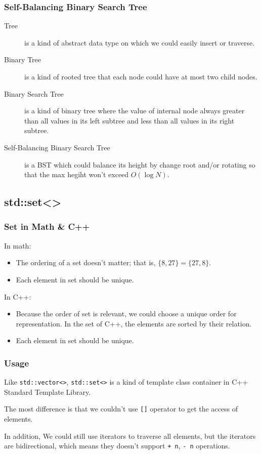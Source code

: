 \documentclass{beamer}
\begin{document}
\frame
{
	\frametitle{Self-Balancing Binary Search Tree}
	
	\begin{description}
		\item[Tree] is a kind of abstract data type on which we could easily insert or traverse.\pause
		\item[Binary Tree] is a kind of rooted tree that each node could have at most two child nodes.\pause
		\item[Binary Search Tree] is a kind of binary tree where the value of internal node always greater than all values in its left subtree and less than all values in its right subtree.\pause
		\item[Self-Balancing Binary Search Tree] is a BST which could balance its height by change root and/or rotating so that the max hegiht won't exceed $O(\log N)$.
	\end{description}
}

\subsection{std::set<>}

\frame
{
	\frametitle{Set in Math \& C++}
	
	In math:
	\begin{itemize}
		\item<1-> The ordering of a set doesn't matter; that is, $\{8, 27\} = \{27, 8\}$.
		\item<2-> Each element in set should be unique.
	\end{itemize}
	
	In C++:
	\begin{itemize}
		\item<1-> Because the order of set is relevant, we could choose a unique order for representation. In the set of C++, the elements are sorted by their relation.
		\item<2-> Each element in set should be unique.
	\end{itemize}
}

\frame
{
	\frametitle{Usage}
	
	Like \texttt{std::vector<>}, \texttt{std::set<>} is a kind of template class container in C++ Standard Template Library.
	
	The most difference is that we couldn't use \texttt{[]} operator to get the access of elements.
	
	In addition, We could still use iterators to traverse all elements, but the iterators are bidirectional, which means they doesn't support \texttt{+ n}, \texttt{- n} operations.
}
\end{document}
